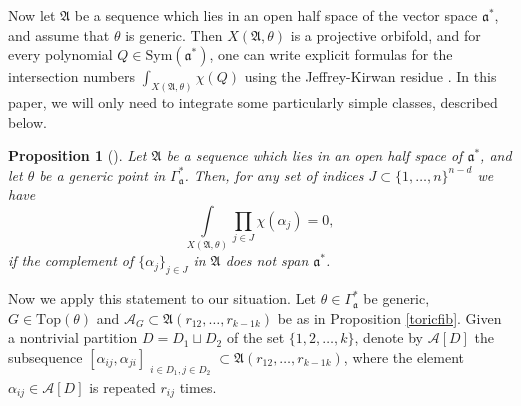 \documentclass[11pt]{article}
\newtheorem{prop}[theo]{Proposition}
\theoremstyle{definition}
\numberwithin{equation}{section}
\newcommand{\A}{\mathfrak{A}}
\begin{document}
Now let $\A$ be a  sequence which lies in an open half space 
of the vector space $\mathfrak{a}^*$, and assume that $ \theta $ is generic. 
Then $ X(\A,\theta) $ is a projective orbifold, and for every 
polynomial $Q\in \mathrm{Sym}(\mathfrak{a}^*)$, one can write explicit formulas 
for  the intersection numbers $\int_{X(\A,\theta)}\chi(Q)$ using the 
Jeffrey-Kirwan residue \cite{BV, SzV}. In this paper, we will only need to 
integrate  some particularly simple classes, described below.

\begin{prop}[{\cite[Proposition 2.3]{SzV}}]\label{toricint}
	Let $\A$ be a  sequence which lies in an open half space 
	of $\mathfrak{a}^*$, and let 
	$\theta$ be a generic point in $\Gamma_\mathfrak{a}^*$. 
	Then, for any set of indices $J\subset \{1, \ldots ,n\}^{n-d}$ we have  
	$$\int\limits_{X(\A,\theta)}\prod_{j\in J}\chi(\alpha_j) = 0,$$ if the 
	complement of $\{\alpha_j\}_{j\in J}$ in $\A$ does not span 
	$\mathfrak{a}^*$.
\end{prop}

Now we apply this statement to our situation.
Let $\theta\in\Gamma_{\mathfrak{a}}^*$ be generic, 
$G\in\mathrm{Top}(\theta)$ and $\mathcal{A}_G\subset\A(r_{12}, \ldots ,r_{k-1 k})$ 
be as in Proposition \ref{toricfib}. Given  a nontrivial partition $D=D_1\sqcup 
D_2$ of the set $\{1,2, \ldots ,k\}$, denote by $\mathcal{A}[{D}]$ the subsequence 
$[\alpha_{ij},\alpha_{ji}]_{\substack{i\in D_1, j\in D_2}}\subset\A(r_{12}, \ldots ,r_{k-1 k})$, 
where the element $\alpha_{ij}\in\mathcal{A}[{D}]$ is repeated $r_{ij}$ times.  
\end{document}
